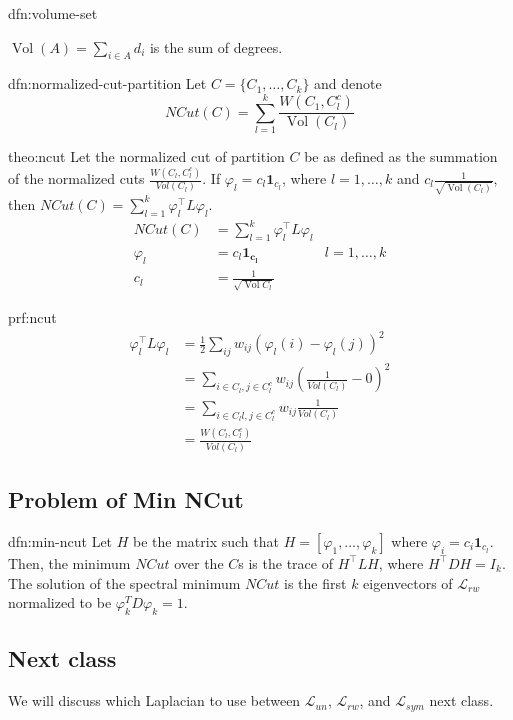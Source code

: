 \documentclass[12pt]{article}
\theoremstyle{plain}
\DeclareMathOperator*{\vol}{Vol}
\begin{document}
\begin{dfn}{dfn:volume-set}

$ \vol(A) = \sum_{i \in A} d_i $ is the sum of degrees.

\end{dfn}

\begin{dfn}{dfn:normalized-cut-partition}
Let $ C = \{ C_1, \ldots, C_k \} $ and denote
\[
NCut(C) = \sum_{l = 1}^k \frac{W(C_1, C_l^c) }{ \vol{(C_l)} }
\]

\end{dfn}

\begin{theo}[NCut]{theo:ncut}
Let the normalized cut of partition $C$ be as defined as the summation of the normalized cuts $\frac{W(C_l, C_l^c)}{Vol(C_l)}$. If $\varphi_l = c_{l} \mathbf{1}_{c_{l}}$, where $l = 1, \ldots, k$ and $c_l \frac{1}{\sqrt{\vol{(C_l)}}}$, then $NCut(C) = \sum_{l = 1}^{k} \varphi_l^{\intercal} L \varphi_{l}$.
  \begin{align*}
    NCut(C) &= \sum_{l = 1}^{k} \varphi_l^{\intercal} L \varphi_{l} \\
    \varphi_l &= c_{l} \mathbf{1_{c_{l}}} & l = 1, \ldots, k \\
    c_l &= \frac{1}{\sqrt{\vol{C_l}}}
	\end{align*}
\end{theo}

\begin{prf}{prf:ncut}
	\begin{align*}
		\varphi_l^{\intercal} L \varphi_{l} &= \frac{1}{2} \sum_{ij} w_{ij}(\varphi_l(i) - \varphi_l(j))^2 \\
		&= \sum_{i \in C_l, j \in C_l^c} w_{ij} (\frac{1}{Vol(C_l)} - 0)^2 \\
		&= \sum_{i \in C_ll, j \in C_l^c} w_{ij} \frac{1}{Vol(C_l)} \\
		&= \frac{W(C_l,C_l^c)}{Vol(C_l)}
	\end{align*}
\end{prf}

\subsection{Problem of Min NCut}
\begin{dfn}{dfn:min-ncut}
	Let $ H $ be the matrix such that $ H = [\varphi_1, \ldots, \varphi_k] $ where $\varphi_i = c_i \mathbf{1}_{c_{l}} $.
	Then, the minimum $ NCut $ over the $ C $s is the trace of $ H^{\intercal} L H $, where $ H^{\intercal} D H = I_{k} $.
The solution of the spectral minimum $ NCut $ is the first $ k $ eigenvectors of $ \mathcal{L}_{rw} $ normalized to be $\varphi_k^T D \varphi_k = 1$.
\end{dfn}

\subsection{Next class}

We will discuss which Laplacian to use between $\mathcal{L}_{un}$, $\mathcal{L}_{rw}$, and $\mathcal{L}_{sym}$ next class.

{}

\end{document}
